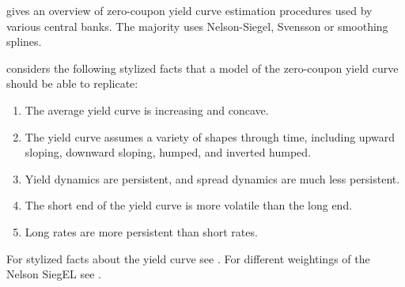










\cite{BIS2005, Bolder1999, Bliss1997, Soederlind1997, Ioannides2003, Diebold2006, Nawalkha2005}

\cite{BIS2005} gives an overview of zero-coupon yield curve estimation procedures used by various central banks. The majority uses Nelson-Siegel, Svensson or smoothing splines.

\cite{Diebold2006} considers the following stylized facts that a model of the zero-coupon yield curve should be able to replicate:

\begin{enumerate}
   \item The average yield curve is increasing and concave.
   \item The yield curve assumes a variety of shapes through time, including upward sloping, downward sloping, humped, and inverted humped.
   \item Yield dynamics are persistent, and spread dynamics are much less persistent.
    \item The short end of the yield curve is more volatile than the long end.
    \item Long rates are more persistent than short rates.
\end{enumerate}

For stylized facts about the yield curve see \cite[p. 7]{Diebold2006}. For different weightings of the Nelson SiegEL see \cite{Soederlind1997, Bliss1997}.

